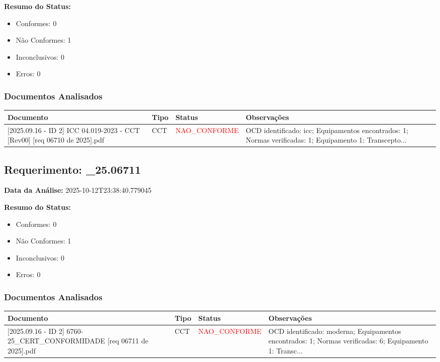 \documentclass[12pt,a4paper]{article}
\begin{document}
\textbf{Resumo do Status:}
\begin{itemize}
    \item Conformes: 0
    \item Não Conformes: 1
    \item Inconclusivos: 0
    \item Erros: 0
\end{itemize}

\subsubsection{Documentos Analisados}

\begin{longtable}{|p{4cm}|p{2cm}|p{2cm}|p{6cm}|}
\hline
\textbf{Documento} & \textbf{Tipo} & \textbf{Status} & \textbf{Observações} \\
\hline
\endhead
[Certificado de Conformidade Técnica - CCT][2025.09.16 - ID 2] ICC 04.019-2023 - CCT [Rev00] [req 06710 de  2025].pdf & CCT & \textcolor{red}{NAO\_CONFORME} & OCD identificado: icc; Equipamentos encontrados: 1; Normas verificadas: 1; Equipamento 1: Transcepto... \\
\hline
\end{longtable}


\subsection{Requerimento: \_25.06711}

\textbf{Data da Análise:} 2025-10-12T23:38:40.779045

\textbf{Resumo do Status:}
\begin{itemize}
    \item Conformes: 0
    \item Não Conformes: 1
    \item Inconclusivos: 0
    \item Erros: 0
\end{itemize}

\subsubsection{Documentos Analisados}

\begin{longtable}{|p{4cm}|p{2cm}|p{2cm}|p{6cm}|}
\hline
\textbf{Documento} & \textbf{Tipo} & \textbf{Status} & \textbf{Observações} \\
\hline
\endhead
[Certificado de Conformidade Técnica - CCT][2025.09.16 - ID 2] 6760-25\_CERT\_CONFORMIDADE [req 06711 de  2025].pdf & CCT & \textcolor{red}{NAO\_CONFORME} & OCD identificado: moderna; Equipamentos encontrados: 1; Normas verificadas: 6; Equipamento 1: Transc... \\
\hline
\end{longtable}
\end{document}
